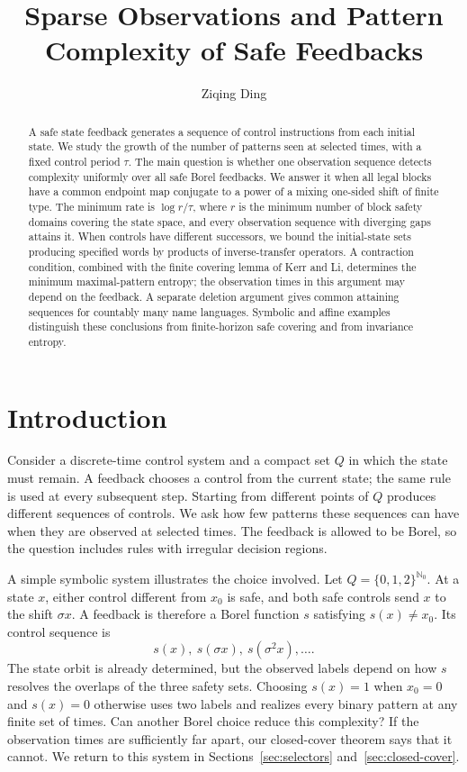 \documentclass[11pt,reqno]{amsart}
\title[Sparse observations of safe feedbacks]{Sparse Observations and Pattern Complexity of Safe Feedbacks}
\author{Ziqing Ding}
\date{}
\numberwithin{equation}{section}
\theoremstyle{definition}
\theoremstyle{definition}
\newcommand{\Nzero}{\mathbb N_0}
\begin{document}
\begin{abstract}
A safe state feedback generates a sequence of control instructions from
each initial state. We study the growth of the number of patterns seen
at selected times, with a fixed control period $\tau$. The main question
is whether one observation sequence detects complexity uniformly over
all safe Borel feedbacks. We answer it when all legal blocks have
a common endpoint map conjugate to a power of a mixing one-sided shift
of finite type. The minimum rate is $\log r/\tau$, where $r$ is the
minimum number of block safety domains covering the state space, and
every observation sequence with diverging gaps attains it. When controls
have different successors, we bound the initial-state sets producing
specified words by products of inverse-transfer operators. A contraction
condition, combined with the finite covering lemma of Kerr and Li,
determines the minimum maximal-pattern entropy; the observation times
in this argument may depend on the feedback. A separate deletion
argument gives common attaining sequences for countably many name
languages. Symbolic and affine examples distinguish these conclusions
from finite-horizon safe covering and from invariance entropy.
\end{abstract}
\maketitle

\section{Introduction}\label{sec:intro}

Consider a discrete-time control system and a compact set $Q$ in which
the state must remain. A feedback chooses a control from the current
state; the same rule is used at every subsequent step. Starting from
different points of $Q$ produces different sequences of controls. We
ask how few patterns these sequences can have when they are observed
at selected times. The feedback is allowed to be Borel, so the question
includes rules with irregular decision regions.

A simple symbolic system illustrates the choice involved. Let
$Q=\{0,1,2\}^{\Nzero}$. At a state $x$, either control different
from $x_0$ is safe, and both safe controls send $x$ to the shift
$\sigma x$. A feedback is therefore a Borel function $s$ satisfying
$s(x)\ne x_0$. Its control sequence is
\[
 s(x),\ s(\sigma x),\ s(\sigma^2x),\ldots.
\]
The state orbit is already determined, but the observed labels depend
on how $s$ resolves the overlaps of the three safety sets. Choosing
$s(x)=1$ when $x_0=0$ and $s(x)=0$ otherwise uses two labels and
realizes every binary pattern at any finite set of times. Can another
Borel choice reduce this complexity? If the observation times are
sufficiently far apart, our closed-cover theorem says that it cannot.
We return to this system in Sections~\ref{sec:selectors}
and~\ref{sec:closed-cover}.
\end{document}
